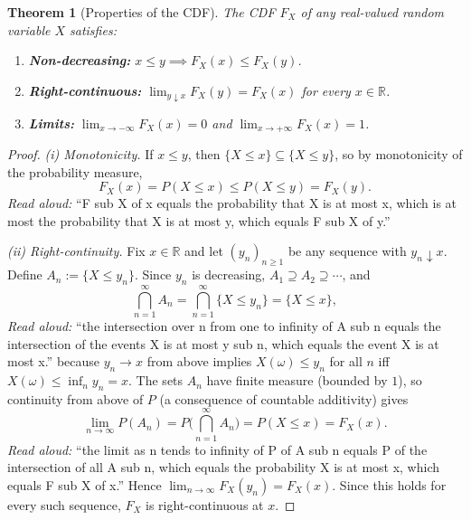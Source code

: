 \documentclass[11pt]{article}
\newtheorem{theorem}{Theorem}
\begin{document}
\begin{theorem}[Properties of the CDF]\label{thm:cdf}
The CDF $F_X$ of any real-valued random variable $X$ satisfies:
\begin{enumerate}
    \item[\textup{(i)}] \textbf{Non-decreasing:} $x \le y \implies F_X(x) \le F_X(y)$.
    \item[\textup{(ii)}] \textbf{Right-continuous:} $\lim_{y \downarrow x} F_X(y) = F_X(x)$ for every $x \in \mathbb{R}$.
    \item[\textup{(iii)}] \textbf{Limits:} $\displaystyle \lim_{x \to -\infty} F_X(x) = 0$ and $\displaystyle \lim_{x \to +\infty} F_X(x) = 1$.
\end{enumerate}
\end{theorem}

\begin{proof}
\emph{(i) Monotonicity.} If $x \le y$, then $\{X \le x\} \subseteq \{X \le y\}$, so by monotonicity of the probability measure,
\[
F_X(x) = P(X \le x) \le P(X \le y) = F_X(y).
\]
\emph{Read aloud:} ``F sub X of x equals the probability that X is at most x, which is at most the probability that X is at most y, which equals F sub X of y.''

\emph{(ii) Right-continuity.} Fix $x \in \mathbb{R}$ and let $(y_n)_{n \ge 1}$ be any sequence with $y_n \downarrow x$. Define $A_n := \{X \le y_n\}$. Since $y_n$ is decreasing, $A_1 \supseteq A_2 \supseteq \cdots$, and
\[
\bigcap_{n=1}^\infty A_n = \bigcap_{n=1}^\infty \{X \le y_n\} = \{X \le x\},
\]
\emph{Read aloud:} ``the intersection over n from one to infinity of A sub n equals the intersection of the events X is at most y sub n, which equals the event X is at most x.''
because $y_n \to x$ from above implies $X(\omega) \le y_n$ for all $n$ iff $X(\omega) \le \inf_n y_n = x$. The sets $A_n$ have finite measure (bounded by $1$), so continuity from above of $P$ (a consequence of countable additivity) gives
\[
\lim_{n \to \infty} P(A_n) = P\!\Big( \bigcap_{n=1}^\infty A_n \Big) = P(X \le x) = F_X(x).
\]
\emph{Read aloud:} ``the limit as n tends to infinity of P of A sub n equals P of the intersection of all A sub n, which equals the probability X is at most x, which equals F sub X of x.''
Hence $\lim_{n \to \infty} F_X(y_n) = F_X(x)$. Since this holds for every such sequence, $F_X$ is right-continuous at $x$.


\end{proof}
\end{document}
